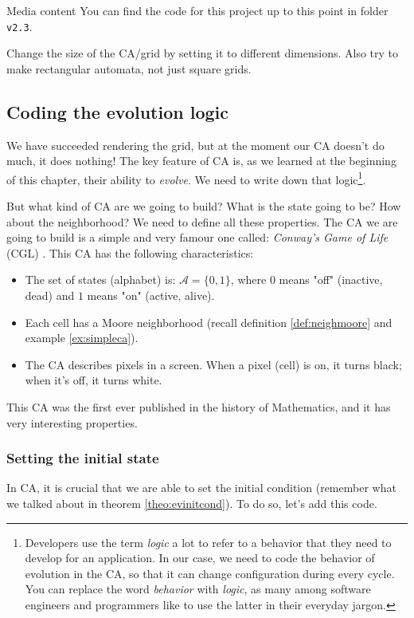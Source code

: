 \begin{trailer}{Media content}
You can find the code for this project up to this point in folder \texttt{v2.3}.
\end{trailer}

\begin{problem}
\label{prob:changecasize}
Change the size of the CA/grid by setting it to different dimensions. Also try to make rectangular
automata, not just square grids.
\end{problem}

\subsection{Coding the evolution logic}
We have succeeded rendering the grid, but at the moment our CA doesn't do much, it does nothing!
The key feature of CA is, as we learned at the beginning of this chapter, their ability to
\textit{evolve}. We need to write down that
logic\footnote{Developers use the term \textit{logic} a lot to refer to a behavior that they need
to develop for an application. In our case, we need to code the behavior of evolution in the CA,
so that it can change configuration during every cycle. You can replace the word
\textit{behavior} with \textit{logic}, as many among software engineers and programmers like to
use the latter in their everyday jargon.}.

But what kind of CA are we going to build? What is the state going to be? How about the neighborhood? We
need to define all these properties. The CA we are going to build is a simple and very famour one called:
\textit{Conway's Game of Life} (CGL) \cite{wolfram-ca}.
This CA has the following characteristics:

\begin{itemize}
\item The set of states (alphabet) is: $\mathcal{A} = \{ 0, 1 \}$, where $0$ means "off" (inactive, dead) and
$1$ means "on" (active, alive).
\item Each cell has a Moore neighborhood (recall definition \ref{def:neighmoore} and example \ref{ex:simpleca}).
\item The CA describes pixels in a screen. When a pixel (cell) is on, it turns black; when it's off, it
turns white. 
\end{itemize}

This CA was the first ever published in the history of Mathematics, and it has very interesting properties.

\subsubsection{Setting the initial state}
In CA, it is crucial that we are able to set the initial condition (remember what we talked about in
theorem \ref{theo:evinitcond}). To do so, let's add this code.

